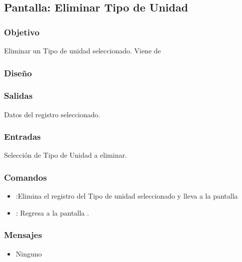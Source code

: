 \subsection{Pantalla: Eliminar Tipo de Unidad}

\subsubsection{Objetivo}
Eliminar un Tipo de unidad seleccionado. Viene de 

\subsubsection{Diseño}

\subsubsection{Salidas}
Datos del registro seleccionado.

\subsubsection{Entradas}
Selección de Tipo de Unidad a eliminar.


\subsubsection{Comandos}
\begin{itemize}
 \item {}:Elimina el registro del Tipo de unidad seleccionado y lleva a la pantalla  
 \item {}: Regresa a la pantalla .
\end{itemize}

\subsubsection{Mensajes}
\begin{itemize}
	\item Ninguno
\end{itemize}



